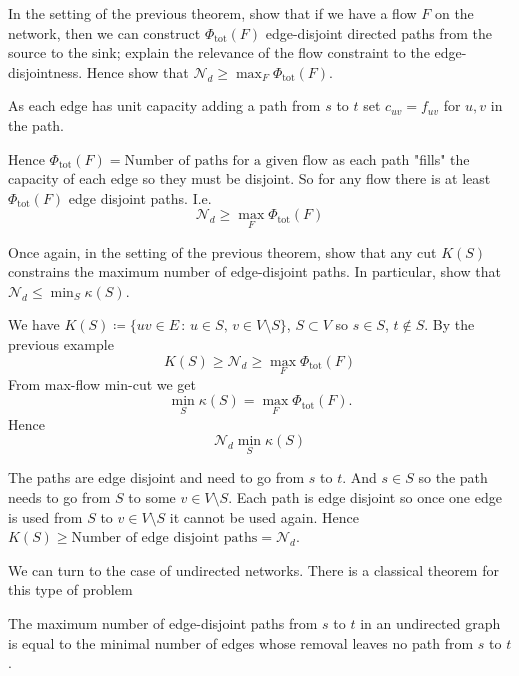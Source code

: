 \documentclass[10pt, a4paper]{article}
\begin{document}
\begin{example}
    In the setting of the previous theorem,
    show that if we have a flow $F$ on the network,
    then we can construct $\Phi_{\text{tot}}(F)$ edge-disjoint directed paths from the source to the sink;
    explain the relevance of the flow constraint to the edge-disjointness.
    Hence show that $\mathcal{N}_d \geq \max_{F}\Phi_{\text{tot}}(F)$.

    \begin{solution}
        As each edge has unit capacity adding a path from $s$ to $t$ set $c_{uv} = f_{uv}$ for $u, v$ in the path.

        Hence $\Phi_{\text{tot}}(F) = \text{Number of paths for a given flow}$ as each path "fills" the capacity of each edge so they must be disjoint.
        So for any flow there is at least $\Phi_{\text{tot}}(F)$ edge disjoint paths.
        I.e.
        \[
        \mathcal{N}_d \geq \max_{F}\Phi_{\text{tot}}(F)
        \]
    \end{solution}
\end{example}

\begin{example}
    Once again,
    in the setting of the previous theorem,
    show that any cut $K(S)$ constrains the maximum number of edge-disjoint paths.
    In particular,
    show that $\mathcal{N}_d \leq \min_{S}\kappa(S)$.

    \begin{solution}
        We have $K(S) \coloneqq \{uv \in E\,:\, u \in S,\, v \in V \setminus S\}$,
        $S \subset V$ so $s \in S$,
        $t \notin S$.
        By the previous example
        \[
        K(S) \geq \mathcal{N}_d \geq \max_F\Phi_{\text{tot}}(F)
        \]
        From max-flow min-cut we get
        \[
        \min_S\kappa(S) = \max_F\Phi_{\text{tot}}(F).
        \]
        Hence
        \[
        \mathcal{N}_d \min_S\kappa(S)
        \]
        

        The paths are edge disjoint and need to go from $s$ to $t$.
        And $s \in S$ so the path needs to go from $S$ to some $v \in V \setminus S$.
        Each path is edge disjoint so once one edge is used from $S$ to $v \in V \setminus S$ it cannot be used again.
        Hence $K(S) \geq \text{Number of edge disjoint paths} = \mathcal{N}_d$.
        
    \end{solution}
\end{example}

We can turn to the case of undirected networks.
There is a classical theorem for this type of problem
\begin{theorem}
    The maximum number of edge-disjoint paths from $s$ to $t$ in an undirected graph is equal to the minimal number of edges whose removal leaves no path from $s$ to $t$.
\end{theorem}
\end{document}
